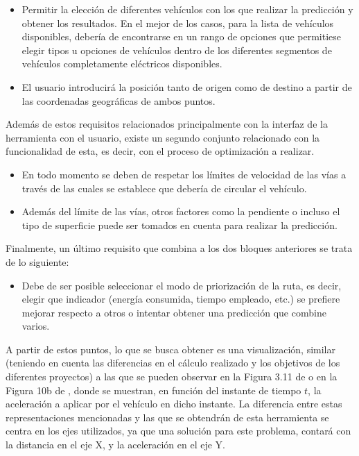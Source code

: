 \documentclass[11pt,spanish,listoffigures,listoftables]{tfgetsinf}
\begin{document}
\begin{itemize}
    \item Permitir la elección de diferentes vehículos con los que realizar la predicción y obtener los resultados. En el mejor de los casos, para la lista de vehículos disponibles, debería de encontrarse en un rango de opciones que permitiese elegir tipos u opciones de vehículos dentro de los diferentes segmentos de vehículos completamente eléctricos disponibles.
    \item El usuario introducirá la posición tanto de origen como de destino a partir de las coordenadas geográficas de ambos puntos.
\end{itemize}

Además de estos requisitos relacionados principalmente con la interfaz de la herramienta con el usuario, existe un segundo conjunto relacionado con la funcionalidad de esta, es decir, con el proceso de optimización a realizar.

\begin{itemize}
    \item En todo momento se deben de respetar los límites de velocidad de las vías a través de las cuales se establece que debería de circular el vehículo.
    \item Además del límite de las vías, otros factores como la pendiente o incluso el tipo de superficie puede ser tomados en cuenta para realizar la predicción.
\end{itemize}

Finalmente, un último requisito que combina a los dos bloques anteriores se trata de lo siguiente:

\begin{itemize}
    \item Debe de ser posible seleccionar el modo de priorización de la ruta, es decir, elegir que indicador (energía consumida, tiempo empleado, etc.) se prefiere mejorar respecto a otros o intentar obtener una predicción que combine varios.
\end{itemize}

A partir de estos puntos, lo que se busca obtener es una visualización, similar (teniendo en cuenta las diferencias en el cálculo realizado y los objetivos de los diferentes proyectos) a las que se pueden observar en la Figura 3.11 de \cite{Bader13} o en la Figura 10b de \cite{EVS26}, donde se muestran, en función del instante de tiempo $t$, la aceleración a aplicar por el vehículo en dicho instante. La diferencia entre estas representaciones mencionadas y las que se obtendrán de esta herramienta se centra en los ejes utilizados, ya que una solución para este problema, contará con la distancia en el eje X, y la aceleración en el eje Y.
\end{document}
